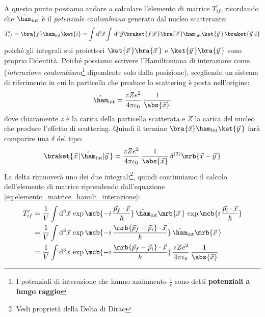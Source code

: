 A questo punto possiamo andare a calcolare l'elemento di matrice
$T_{if}^\prime$, ricordando che $\hat{\ham}_{\text{int}}$ è il
\textit{potenziale coulombiano} generato dal nucleo scatterante:
\begin{equation}
  T_{if}^\prime = \bra{f}\ham_{\text{int}}\ket{i} = \int \mathrm{d}^3\vec{x}
  \int \, \mathrm{d}^3\vec{y} \braket{f\vert\vec{x}\,}
  \bra{\vec{x}\,}\ham_{\text{int}} \ket{\vec{y}\,} \, \braket{\vec{y}\,\vert i}
  \label{eq:elemento_matrice_hamilt_interazione}
\end{equation}
poiché gli integrali sui proiettori $\ket{\vec{x}\,}\bra{\vec{x}\,}$ e
$\ket{\vec{y}\,}\bra{\vec{y}\,}$ sono proprio l'identità. Poiché possiamo
scrivere l'Hamiltoniana di interazione come (\textit{interazione
coulombiana}\footnote{
  I potenziali di interazione che hanno andamento $\frac{1}{r}$ sono detti
  \textbf{potenziali a lungo raggio}
} dipendente solo dalla posizione),
scegliendo un sistema di riferimento in cui la particella che produce lo
scattering è posta nell'origine:
\begin{equation}
  \hat{\ham}_{\text{int}} = \frac{zZe^2}{4\pi\epsilon_0} \,
  \frac{1}{\abs{\vec{x}}\,}
  \label{eq:ham_int_puntiforme}
\end{equation}
dove chiaramente $z$ è la carica della particella scatterata e $Z$ la carica
del nucleo che produce l'effetto di scattering.
Quindi il termine $\bra{\vec{x}}\ham_{\text{int}}\ket{\vec{y}\,}$ farà
comparire una $\delta$ del tipo:
\begin{equation}
  \braket{\vec{x}\, \vert \hat{\ham} _{\text{int}} \vert \vec{y}\,} = 
  \frac{zZe^2}{4\pi\epsilon_0} \, \frac{1}{\abs{\vec{x}}} \, \delta^{(3)}
  \mrb{\vec{x} - \vec{y}\,}
\end{equation}
La delta rimuoverà uno dei due integrali\footnote{Vedi proprietà della Delta di
Dirac}, quindi continuiamo il calcolo dell'elemento di matrice riprendendo
dall'equazione \ref{eq:elemento_matrice_hamilt_interazione}:
\begin{equation}
  \begin{split}
    T_{if}^\prime & = \frac{1}{V} \int \mathrm{d}^3\vec{x} \, \exp{\mcb{-i \,
    \frac{\vec{p}_f\cdot\vec{x}}{\hbar}}} \,
    \hat{\ham}_{\text{int}}\mrb{\vec{x}\,} \, \exp{\mcb{i \,
    \frac{\vec{p}_i\cdot\vec{x}}{\hbar}}} \\
    & = \frac{1}{V} \int \mathrm{d}^3\vec{x} \,  \exp\mcb{-i \,
    \frac{\mrb{\vec{p}_f-\vec{p}_i}\cdot\vec{x}}{\hbar}} \,
    \hat{\ham}_{\text{int}}\mrb{\vec{x}\,} \\
    & = \frac{1}{V} \int \mathrm{d}^3\vec{x} \,  \exp\mcb{-i \,
    \frac{\mrb{\vec{p}_f-\vec{p}_i}\cdot\vec{x}}{\hbar}} \,
    \frac{zZe^2}{4\pi\epsilon_0} \, \frac{1}{\abs{\vec{x}}}
  \end{split}
\end{equation}
